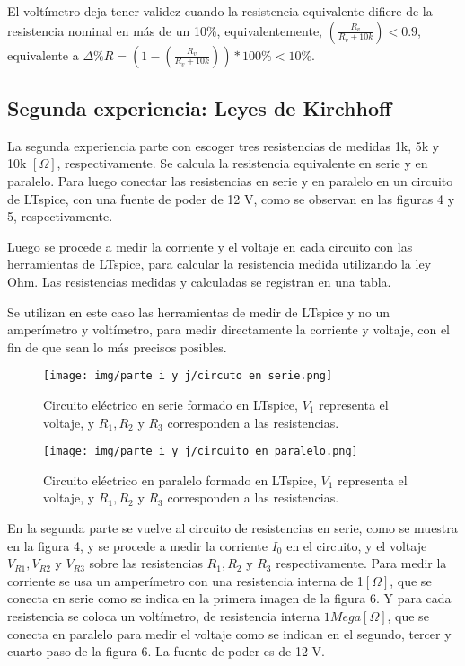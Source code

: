 \documentclass[letterpaper,11pt]{article} %
\begin{document}
El voltímetro deja tener validez cuando la resistencia equivalente difiere de la resistencia nominal en más de un 10\%, equivalentemente, $\left (\frac{R_v}{R_v+10k}  \right )<0.9$, equivalente a $\Delta\% R= \left (1-\left (\frac{R_v}{R_v+10k}  \right )\right )*100\%<10\% $.




\subsection{Segunda experiencia: Leyes de Kirchhoff}
La segunda experiencia parte con escoger tres resistencias de medidas 1k, 5k y 10k $[\Omega]$, respectivamente. Se calcula la resistencia equivalente en serie y en paralelo. Para luego conectar las resistencias en serie y en paralelo en un circuito de LTspice, con una fuente de poder de 12 V, como se observan en las figuras 4 y 5, respectivamente.

Luego se procede a medir la corriente y el voltaje 
en cada circuito con las herramientas de LTspice,
para calcular la resistencia medida utilizando la ley
Ohm. Las resistencias medidas y calculadas se registran
en una tabla.

Se utilizan en este caso las herramientas de medir de LTspice
y no un amperímetro y voltímetro, para medir directamente
la corriente y voltaje, con el fin de que sean lo más precisos posibles.
\begin{figure}[H]
\caption{Circuito eléctrico en serie formado en LTspice, $V_1$ representa el voltaje, y $R_1,R_2$ y $R_3$ corresponden a las resistencias.}
\centering
\texttt{[image: img/parte i y j/circuto en serie.png]}
\end{figure}
\begin{figure}[H]
\caption{Circuito eléctrico en paralelo formado en LTspice, $V_1$ representa el voltaje, y $R_1,R_2$ y $R_3$ corresponden a las resistencias.}
\centering
\texttt{[image: img/parte i y j/circuito en paralelo.png]}
\end{figure}
En la segunda parte se vuelve al circuito de resistencias en serie, como se muestra en la figura 4, y se procede a medir la corriente $I_0$ en el circuito, y el voltaje $V_{R1},V_{R2} $ y $V_{R3}$ sobre las resistencias $R_1, R_2$ y $R_3$ respectivamente. Para medir la corriente se usa un amperímetro con una resistencia interna de 1$[\Omega]$, que se conecta en serie como se indica en la primera imagen de la figura 6. Y para cada resistencia se coloca un voltímetro, de resistencia interna $1 Mega [\Omega]$, que se conecta en paralelo para medir el voltaje como se indican en el segundo, tercer y cuarto paso de la figura 6. La fuente de poder es de 12 V.
\end{document}
